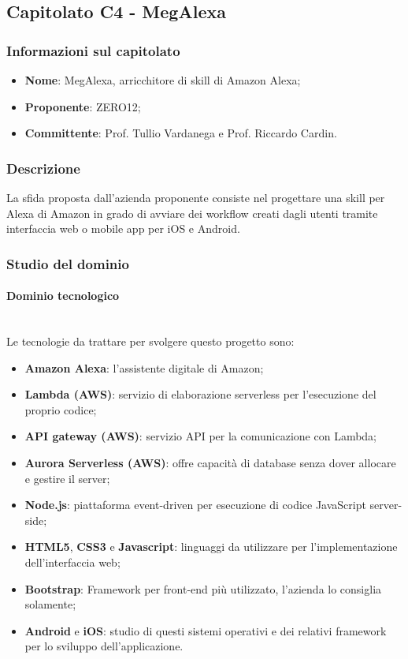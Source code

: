 \subsection{Capitolato C4 - MegAlexa}
\subsubsection{Informazioni sul capitolato}
\begin{itemize}
    \item \textbf{Nome}: MegAlexa, arricchitore di skill di Amazon Alexa;
	\item \textbf{Proponente}: ZERO12; 
	\item \textbf{Committente}: Prof. Tullio Vardanega e Prof. Riccardo Cardin.
\end{itemize}
\subsubsection{Descrizione}
La sfida proposta dall'azienda proponente consiste nel progettare una skill per 
Alexa di Amazon
in grado di avviare dei workflow creati dagli utenti tramite interfaccia web o
mobile app per iOS e Android.

\subsubsection{Studio del dominio}
\paragraph{Dominio tecnologico} \mbox{}\\
Le tecnologie da trattare per svolgere questo progetto sono:
\begin{itemize}
    \item \textbf{Amazon Alexa}: l'assistente digitale di Amazon;
    \item \textbf{Lambda (AWS)}: servizio di elaborazione serverless per 
l'esecuzione del proprio codice;
    \item \textbf{API gateway (AWS)}: servizio API per la comunicazione con 
Lambda;
    \item \textbf{Aurora Serverless (AWS)}: offre capacità di database senza 
dover allocare e gestire il server;
    \item \textbf{Node.js}: piattaforma event-driven per esecuzione di codice 
JavaScript server-side;
    \item \textbf{HTML5}, \textbf{CSS3} e \textbf{Javascript}: linguaggi da 
utilizzare per l'implementazione
    dell'interfaccia web;
    \item \textbf{Bootstrap}: Framework per front-end più utilizzato, l'azienda 
lo consiglia solamente;
	\item \textbf{Android} e \textbf{iOS}: studio di questi sistemi operativi e 
	dei relativi framework per lo sviluppo dell'applicazione. 

\end{itemize}
